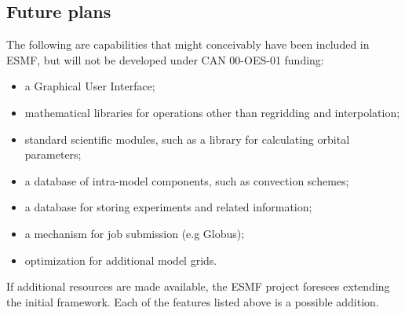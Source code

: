 \subsection{Future plans}

The following are capabilities that might conceivably have been
included in ESMF, but will not be developed under CAN 00-OES-01
funding:
\begin{itemize}
\item a Graphical User Interface;
\item mathematical libraries for operations other than regridding and
  interpolation;
\item standard scientific modules, such as a library for calculating
  orbital parameters;
\item a database of intra-model components, such as convection schemes;
\item a database for storing experiments and related information;
\item a mechanism for job submission (e.g Globus);
\item optimization for additional model grids.
\end{itemize}

If additional resources are made available, the ESMF project foresees
extending the initial framework.  Each of the features listed above is
a possible addition.





















